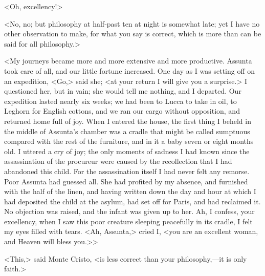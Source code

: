  <Oh, excellency!> 

 <No, no; but philosophy at half-past ten at night is somewhat late; yet I have no other observation to make, for what you say is correct, which is more than can be said for all philosophy.> 

 <My journeys became more and more extensive and more productive. Assunta took care of all, and our little fortune increased. One day as I was setting off on an expedition, <Go,> said she; <at your return I will give you a surprise.> I questioned her, but in vain; she would tell me nothing, and I departed. Our expedition lasted nearly six weeks; we had been to Lucca to take in oil, to Leghorn for English cottons, and we ran our cargo without opposition, and returned home full of joy. When I entered the house, the first thing I beheld in the middle of Assunta's chamber was a cradle that might be called sumptuous compared with the rest of the furniture, and in it a baby seven or eight months old. I uttered a cry of joy; the only moments of sadness I had known since the assassination of the procureur were caused by the recollection that I had abandoned this child. For the assassination itself I had never felt any remorse. Poor Assunta had guessed all. She had profited by my absence, and furnished with the half of the linen, and having written down the day and hour at which I had deposited the child at the asylum, had set off for Paris, and had reclaimed it. No objection was raised, and the infant was given up to her. Ah, I confess, your excellency, when I saw this poor creature sleeping peacefully in its cradle, I felt my eyes filled with tears. <Ah, Assunta,> cried I, <you are an excellent woman, and Heaven will bless you.>> 

 <This,> said Monte Cristo, <is less correct than your philosophy,—it is only faith.> 

